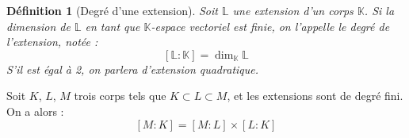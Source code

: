 \documentclass[a4paper,12pt,french]{report}
\newtheorem{definition}{Définition}[section]
\begin{document}
			
			
			
			\begin{definition}[Degré d'une extension]
				Soit \(\mathbb{L}\) une extension d'un corps \(\mathbb{K}\). Si la dimension de \(\mathbb{L}\) en tant que \(\mathbb{K}\)-espace vectoriel est finie, on l'appelle le \emph{degré} de l'extension, notée :
				\[
				[\mathbb{L}:\mathbb{K}] = \dim_\mathbb{K}\mathbb{L}
				\]
				S'il est égal à 2, on parlera d'\emph{extension quadratique}.
			\end{definition}
			
			\begin{proposition}
				Soit \(K\), \(L\), \(M\) trois corps tels que \( K \subset L \subset M\), et les extensions sont de degré fini. On a alors :
				\[
				[M:K] = [M:L]{\times} [L:K]
				\]
			\end{proposition}
\end{document}
